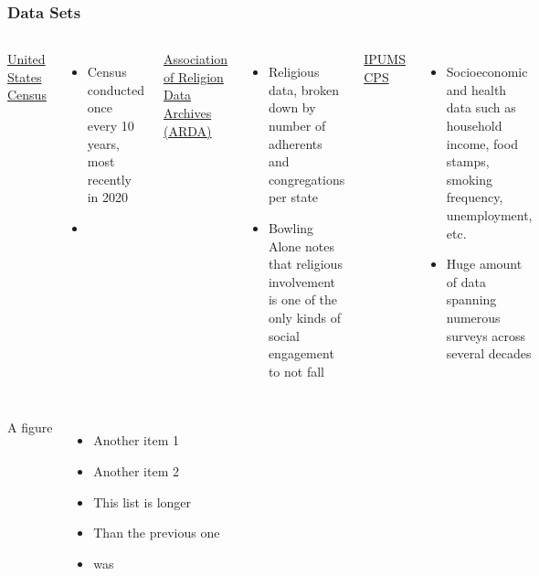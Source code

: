 \documentclass{beamer}
\theoremstyle{definition}
\theoremstyle{remark}
\begin{document}
\begin{frame}
    \frametitle{Data Sets}

    \begin{columns}[T]
        \uline{United States Census}

        \begin{itemize}
            \item Census conducted once every 10 years, most recently in 2020
            \item
        \end{itemize}

        \uline{Association of Religion Data Archives (ARDA)}

        \begin{itemize}
            \item Religious data, broken down by number of adherents and congregations per state
            \item Bowling Alone notes that religious involvement is one of the only kinds of social engagement to not fall
        \end{itemize}

        \uline{IPUMS CPS}

        \begin{itemize}
            \item Socioeconomic and health data such as household income, food stamps, smoking frequency, unemployment, etc.
            \item Huge amount of data spanning numerous surveys across several decades
        \end{itemize}

    \end{columns}


\end{frame}

\begin{frame}

    \begin{columns}
          A figure
          \begin{minipage}[c][.6\textheight][c]{\linewidth}
            \begin{itemize}
                \item Another item 1
                \item Another item 2
                \item This list is longer
                \item Than the previous one
                \item was
            \end{itemize}
          \end{minipage}
      \end{columns}

\end{frame}
\end{document}
